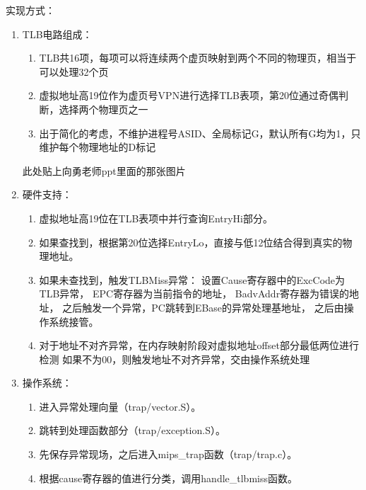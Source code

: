            实现方式：
            \begin{enumerate}
            \item
                TLB电路组成：
                \begin{enumerate}
                \item
                    TLB共16项，每项可以将连续两个虚页映射到两个不同的物理页，相当于可以处理32个页
                \item
                    虚拟地址高19位作为虚页号VPN进行选择TLB表项，第20位通过奇偶判断，选择两个物理页之一
                \item
                    出于简化的考虑，不维护进程号ASID、全局标记G，默认所有G均为1，只维护每个物理地址的D标记
                \end{enumerate}
                此处贴上向勇老师ppt里面的那张图片
            \item
                硬件支持：
                \begin{enumerate}
                \item
                    虚拟地址高19位在TLB表项中并行查询EntryHi部分。
                \item
                    如果查找到，根据第20位选择EntryLo，直接与低12位结合得到真实的物理地址。
                \item
                    如果未查找到，触发TLBMiss异常：%
                    设置Cause寄存器中的ExcCode为TLB异常，%
                    EPC寄存器为当前指令的地址，%
                    BadvAddr寄存器为错误的地址，%
                    之后触发一个异常，PC跳转到EBase的异常处理基地址，%
                    之后由操作系统接管。
                \item
                    对于地址不对齐异常，在内存映射阶段对虚拟地址offset部分最低两位进行检测%
                    如果不为00，则触发地址不对齐异常，交由操作系统处理
                \end{enumerate}
            \item
                操作系统：
                \begin{enumerate}
                \item
                    进入异常处理向量（trap/vector.S）。
                \item
                    跳转到处理函数部分（trap/exception.S）。
                \item
                    先保存异常现场，之后进入mips\_trap函数（trap/trap.c）。
                \item
                    根据cause寄存器的值进行分类，调用handle\_tlbmiss函数。

\end{enumerate}
\end{enumerate}
